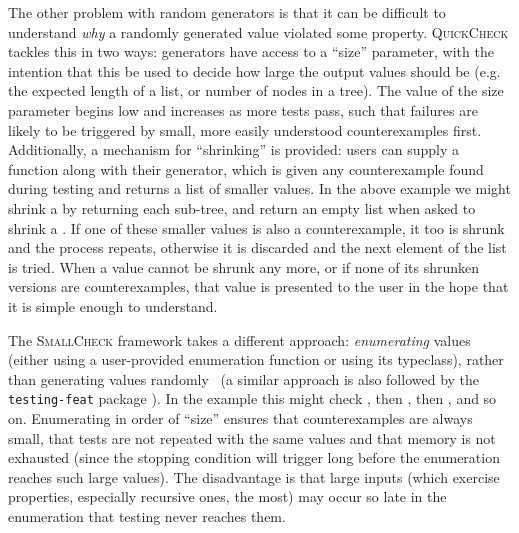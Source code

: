 The other problem with random generators is that it can be difficult to
understand \emph{why} a randomly generated value violated some property.
\textsc{QuickCheck} tackles this in two ways: generators have access to a
``size'' parameter, with the intention that this be used to decide how large the
output values should be (e.g. the expected length of a list, or number of nodes
in a tree). The value of the size parameter begins low and increases as more
tests pass, such that failures are likely to be triggered by small, more easily
understood counterexamples first. Additionally, a mechanism for ``shrinking'' is
provided: users can supply a  function along with their generator,
which is given any counterexample found during testing and returns a list of
smaller values. In the above example we might shrink a  by returning
each sub-tree, and return an empty list when asked to shrink a . If one
of these smaller values is also a counterexample, it too is shrunk and the
process repeats, otherwise it is discarded and the next element of the list is
tried. When a value cannot be shrunk any more, or if none of its shrunken
versions are counterexamples, that value is presented to the user in the hope
that it is simple enough to understand.

The \textsc{SmallCheck} framework takes a different approach: \emph{enumerating}
values (either using a user-provided enumeration function or using its
 typeclass), rather than generating values
randomly~\cite{runciman2008smallcheck} (a similar approach is also followed by
the \texttt{testing-feat} package \iffalse \cite{}TODO} \fi). In the
 example this might check , then , then , and so on. Enumerating in
order of ``size'' ensures that counterexamples are always small, that tests are
not repeated with the same values and that memory is not exhausted (since the
stopping condition will trigger long before the enumeration reaches such large
values). The disadvantage is that large inputs (which exercise properties,
especially recursive ones, the most) may occur so late in the enumeration that
testing never reaches them.

